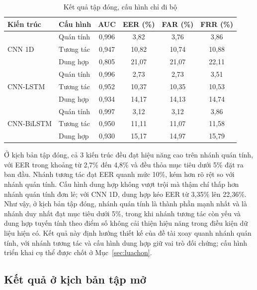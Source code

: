 \documentclass[../DoAn.tex]{subfiles}
\begin{document}
\begin{table}[H]
    \centering
    \caption{Kết quả tập đóng, cấu hình chỉ đi bộ}
    \label{tab:closed_walk}
    \begin{tabular}{|l|l|c|c|c|c|}
    \hline
    \textbf{Kiến trúc} & \textbf{Cấu hình} & \textbf{AUC} & \textbf{EER (\%)} & \textbf{FAR (\%)} & \textbf{FRR (\%)} \\
    \hline
    \multirow{3}{*}{CNN 1D}     & Quán tính & 0,996 & 3,82  & 3,76  & 3,86 \\
                                & Tương tác & 0,947 & 10,82 & 10,74 & 10,88 \\
                                & Dung hợp  & 0,805 & 21,07 & 21,07 & 22,11 \\
    \hline
    \multirow{3}{*}{CNN-LSTM}   & Quán tính & 0,996 & 2,73  & 2,73  & 3,51 \\
                                & Tương tác & 0,952 & 10,37 & 10,35 & 10,53 \\
                                & Dung hợp  & 0,934 & 14,17 & 14,13 & 14,74 \\
    \hline
    \multirow{3}{*}{CNN-BiLSTM} & Quán tính & 0,997 & 3,12  & 3,12  & 3,86 \\
                                & Tương tác & 0,950 & 11,11 & 11,07 & 11,58 \\
                                & Dung hợp  & 0,930 & 15,17 & 14,97 & 15,79 \\
    \hline
    \end{tabular}
\end{table}

Ở kịch bản tập đóng, cả 3 kiến trúc đều đạt hiệu năng cao trên nhánh quán tính, với EER trong khoảng từ 2,7\% đến 4,8\% và đều thỏa mục tiêu dưới 5\% đặt ra ban đầu. Nhánh tương tác đạt EER quanh mức 10\%, kém hơn rõ rệt so với nhánh quán tính. Cấu hình dung hợp không vượt trội mà thậm chí thấp hơn nhánh quán tính đơn lẻ; với CNN 1D, dung hợp kéo EER từ 3,35\% lên 22,36\%. Như vậy, ở kịch bản tập đóng, nhánh quán tính là thành phần mạnh nhất và là nhánh duy nhất đạt mục tiêu dưới 5\%, trong khi nhánh tương tác còn yếu và dung hợp tuyến tính theo điểm số không cải thiện hiệu năng trong điều kiện dữ liệu hiện có. Kết quả này định hướng thiết kế của đề tài xoay quanh nhánh quán tính, với nhánh tương tác và cấu hình dung hợp giữ vai trò đối chứng; cấu hình triển khai cụ thể được chốt ở Mục~\ref{sec:luachon}.

\subsection{Kết quả ở kịch bản tập mở}
\end{document}
